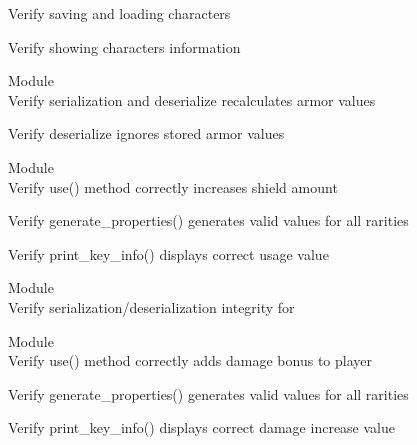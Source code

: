 \begin{DoxyRefList}
\label{test__test000129}%
%
Verify saving and loading characters  



\label{test__test000130}%
%
Verify showing characters information  


\item[Module \doxylink{group___knight_character}{Knight\+Character} ]\hfill \\
\label{test__test000109}%
%
Verify serialization and deserialize recalculates armor values  



\label{test__test000110}%
%
Verify deserialize ignores stored armor values  


\item[Module \doxylink{group___shield_card}{Shield\+Card} ]\hfill \\
\label{test__test000050}%
%
Verify use() method correctly increases shield amount  



\label{test__test000051}%
%
Verify generate\+\_\+properties() generates valid values for all rarities  



\label{test__test000052}%
%
Verify print\+\_\+key\+\_\+info() displays correct usage value  


\item[Module \doxylink{group___tank_character}{Tank\+Character} ]\hfill \\
\label{test__test000113}%
%
Verify serialization/deserialization integrity for   


\item[Module \doxylink{group___weapon_card}{Weapon\+Card} ]\hfill \\
\label{test__test000042}%
%
Verify use() method correctly adds damage bonus to player  



\label{test__test000043}%
%
Verify generate\+\_\+properties() generates valid values for all rarities  



\label{test__test000044}%
%
Verify print\+\_\+key\+\_\+info() displays correct damage increase value  


\end{DoxyRefList}